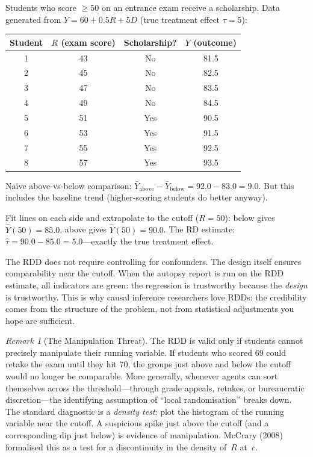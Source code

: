 \documentclass[11pt,a4paper]{article}
\theoremstyle{definition}
\theoremstyle{plain}
\theoremstyle{remark}
\newtheorem{remark}{Remark}[section]
\begin{document}
\begin{numermark}[title={Scholarship Scores and Outcomes}]
Students who score $\geq 50$ on an entrance exam receive a scholarship. Data generated from $Y = 60 + 0.5R + 5D$ (true treatment effect $\tau = 5$):

\begin{center}
\begin{tabular}{@{}cccc@{}}
\toprule
Student & $R$ (exam score) & Scholarship? & $Y$ (outcome) \\
\midrule
1 & 43 & No & 81.5 \\
2 & 45 & No & 82.5 \\
3 & 47 & No & 83.5 \\
4 & 49 & No & 84.5 \\
5 & 51 & Yes & 90.5 \\
6 & 53 & Yes & 91.5 \\
7 & 55 & Yes & 92.5 \\
8 & 57 & Yes & 93.5 \\
\bottomrule
\end{tabular}
\end{center}

Na\"ive above-vs-below comparison: $\bar{Y}_{\text{above}} - \bar{Y}_{\text{below}} = 92.0 - 83.0 = 9.0$. But this includes the baseline trend (higher-scoring students do better anyway).

Fit lines on each side and extrapolate to the cutoff ($R = 50$): below gives $\hat{Y}(50) = 85.0$, above gives $\hat{Y}(50) = 90.0$. The RD estimate: $\hat\tau = 90.0 - 85.0 = 5.0$---exactly the true treatment effect.
\end{numermark}

\begin{repairbox}
The RDD does not require controlling for confounders.
The design itself ensures comparability near the cutoff.
When the autopsy report is run on the RDD estimate, all indicators are green: the regression is trustworthy because the \emph{design} is trustworthy. This is why causal inference researchers love RDDs: the credibility comes from the structure of the problem, not from statistical adjustments you hope are sufficient.
\end{repairbox}

\begin{remark}[The Manipulation Threat]
The RDD is valid only if students cannot precisely manipulate their running variable. If students who scored 69 could retake the exam until they hit 70, the groups just above and below the cutoff would no longer be comparable. More generally, whenever agents can sort themselves across the threshold---through grade appeals, retakes, or bureaucratic discretion---the identifying assumption of ``local randomisation'' breaks down. The standard diagnostic is a \emph{density test}: plot the histogram of the running variable near the cutoff. A suspicious spike just above the cutoff (and a corresponding dip just below) is evidence of manipulation. McCrary (2008) formalised this as a test for a discontinuity in the density of~$R$ at~$c$.
\end{remark}
\end{document}

